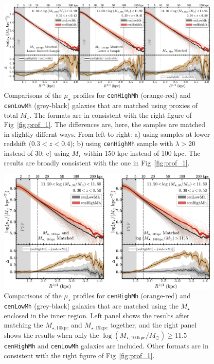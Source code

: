 \documentclass[a4paper,fleqn,usenatbib]{mnras}
\def\rbcg{\texttt{cenHighMh}}
\def\nbcg{\texttt{cenLowMh}}
\def\mstar{{$M_{\star}$}}
\def\minn{{$M_{\star,10\mathrm{kpc}}$}}
\def\meff{{$M_{\star,15\mathrm{kpc}}$}}
\def\logmtot{{$\log (M_{\star,100\mathrm{kpc}}/M_{\odot})$}}
\def\mden{{$\mu_{\star}$}}
\begin{document}
  \begin{figure}
      \centering 
      \includegraphics[width=\textwidth]{fig/redbcg_prof_3}
      \caption{
        Comparisons of the \mden{} profiles for \rbcg{} (orange-red) and \nbcg{} 
      	(grey-black) galaxies that are matched using proxies of total \mstar{}. 
        The formats are in consistent with the right figure of Fig~\ref{fig:prof_1}.
        The differences are, here, the samples are matched in slightly differnt ways. 
        From left to right: a) using samples at lower redshift ($0.3 < z < 0.4$); 
        b) using \rbcg{} sample with $\lambda > 20$ instead of 30; 
        c) using \mstar{} within 150 kpc instead of 100 kpc.
        The results are broadly consistent with the one in Fig~\ref{fig:prof_1}.
        }
      \label{fig:prof_3} 
  \end{figure}

  \begin{figure}
      \centering 
      \includegraphics[width=\textwidth]{fig/redbcg_prof_4}
      \caption{
          Comparisons of the \mden{} profiles for \rbcg{} (orange-red) and \nbcg{} 
          (grey-black) galaxies that are matched using the \mstar{} enclosed in the 
          inner region. 
          Left panel shows the results after matching the \minn{} and \meff{} together, 
          and the right panel shows the results when only the \logmtot{}$\ge 11.5$
          \rbcg{} and \nbcg{} galaxies are included.
          Other formats are in consistent with the right figure of Fig~\ref{fig:prof_1}.
          }
      \label{fig:prof_4} 
  \end{figure}

\bsp
\label{lastpage}
\end{document}
